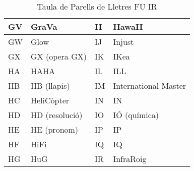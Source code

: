 \begin{table}[!ht]
\begin{tabular}{l|l|l|l}
    GV & GraVa          & II & HawaII               \\\hline
    GW & Glow           & IJ & Injust               \\\hline
    GX & GX (opera GX)  & IK & IKea                 \\\hline
    HA & HAHA           & IL & ILL                  \\\hline
    HB & HB (llapis)    & IM & International Master \\\hline
    HC & HeliCòpter     & IN & IN                   \\\hline
    HD & HD (resolució) & IO & IÓ (química)         \\\hline
    HE & HE (pronom)    & IP & IP                   \\\hline
    HF & HiFi           & IQ & IQ                   \\\hline
    HG & HuG            & IR & InfraRoig            \\\hline
    \end{tabular}
    \caption{Taula de Parells de Lletres FU \rightarrow IR}
    \label{tla:lletres-3}
    \end{table}

